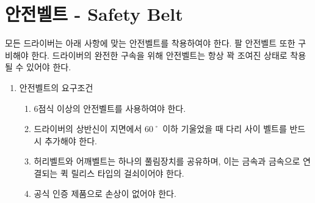 \documentclass[final,a4paper,10pt]{report}
\begin{document}
\section{안전벨트 - Safety Belt}\label{rule:formula-technical.safety-belt} \label{section:안전벨트}
  모든 드라이버는 아래 사항에 맞는 안전벨트를 착용하여야 한다. 팔 안전벨트 또한 구비해야 한다. 드라이버의 완전한 구속을 위해 안전벨트는 항상 꽉 조여진 상태로 착용될 수 있어야 한다.
  \begin{enumerate}
    \item\label{rule:formula-technical.safety-belt.harness} 안전벨트의 요구조건
      \begin{enumerate}
        \item\label{rule:formula-technical.safety-belt.harness.min-six-point-harness} 6점식 이상의 안전벨트를 사용하여야 한다.
        \item\label{rule:formula-technical.safety-belt.harness.extra-strap-if-reclined} 드라이버의 상반신이 지면에서 60˚ 이하 기울었을 때 다리 사이 벨트를 반드시 추가해야 한다.
        \item\label{rule:formula-technical.safety-belt.harness.shared-metal-buckle-release} 허리벨트와 어깨벨트는 하나의 풀림장치를 공유하며, 이는 금속과 금속으로 연결되는 퀵 릴리스 타입의 걸쇠이어야 한다.
        \item\label{rule:formula-technical.safety-belt.harness.certified-and-undamaged} 공식 인증 제품으로 손상이 없어야 한다.


\end{enumerate}
\end{enumerate}
\end{document}
